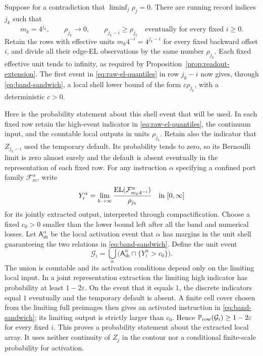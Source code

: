 Suppose for a contradiction that \(\liminf_j\rho_j=0\).  There are running
record indices \(j_k\) such that
\begin{equation}\label{eq:record-low-units}
 m_k=4^{j_k},\qquad \rho_{j_k}\longrightarrow0,\qquad
 \rho_{j_k-i}\ge\rho_{j_k}
 \quad\text{eventually for every fixed }i\ge0.
\end{equation}
Retain the rows with effective units \(m_k4^{-i}=4^{j_k-i}\) for every
fixed backward offset \(i\), and divide all their edge-EL observations by
the same number \(\rho_{j_k}\).  Each fixed effective unit tends to
infinity, as required by Proposition~\ref{prop:readout-extension}.
The first event in \eqref{eq:raw-el-quantiles} in row \(j_k-i\) now gives,
through \eqref{eq:band-sandwich}, a local shell lower bound of the form
\(c\rho_{j_k}\), with a deterministic \(c>0\).

Here is the probability statement about this shell event that will be used.
In each fixed row retain the high-event indicator in
\eqref{eq:raw-el-quantiles}, the continuum input, and the countable local
outputs in units \(\rho_{j_k}\).  Retain also the indicator that
\(Z_{j_k-i}\) used the temporary default.  Its probability tends to zero,
so its Bernoulli limit is zero almost surely and the default is absent
eventually in the representation of each fixed row.
For any instruction \(\alpha\) specifying
a confined port family \(\mathcal F_m^\alpha\), write
\[
 Y_i^\alpha
 =\lim_{k\to\infty}
   \frac{\operatorname{EL}(\mathcal F_{m_k4^{-i}}^\alpha)}{\rho_{j_k}}
 \quad\hbox{in }[0,\infty]
\]
for its jointly extracted output, interpreted through compactification.
Choose a fixed \(c_0>0\) smaller than the lower bound left after all the
band and numerical losses.  Let \(\mathsf A_{\mathrm{sh}}^\alpha\) be the
local activation event that \(\alpha\) has margins in the unit shell
guaranteeing the two relations in \eqref{eq:band-sandwich}.  Define the
unit event
\begin{equation}\label{eq:high-unit-event}
 \mathcal G_i
 =\bigcup_{\alpha}
   \bigl(\mathsf A_{\mathrm{sh}}^\alpha\cap\{Y_i^\alpha>c_0\}\bigr).
\end{equation}
The union is countable and its activation conditions depend only on the
limiting local input.  In a joint representation extraction the limiting
high indicator has probability at least \(1-2\varepsilon\).  On the event
that it equals \(1\), the discrete indicators equal \(1\) eventually and
the temporary default is absent.
A finite cell cover chosen from the limiting full preimages then gives
an activated instruction in \eqref{eq:band-sandwich}; its limiting output
is strictly larger than \(c_0\).  Hence
\(\mathbb P_{\mathrm{row}}(\mathcal G_i)\ge1-2\varepsilon\) for every fixed
\(i\).  This proves a probability statement about the extracted local
array.  It uses neither continuity of \(Z_j\) in the contour nor a
conditional finite-scale probability for activation.

